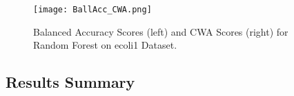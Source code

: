 \documentclass{article}
\begin{document}




\begin{figure}
    \centering
    \texttt{[image: BallAcc\_CWA.png]}
    \caption{Balanced Accuracy Scores (left) and CWA Scores (right) for Random Forest on ecoli1 Dataset.}\label{cwa}
\end{figure}

\subsection{Results Summary}\label{sec:res5}
\end{document}
